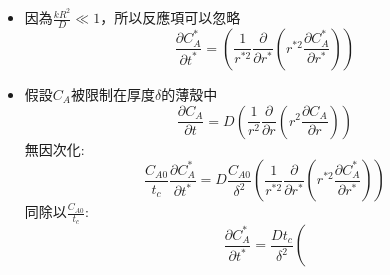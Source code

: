 \documentclass[../main.tex]{subfiles}
\begin{document}
\begin{itemize}
\begin{enumerate}
\begin{itemize}
\begin{equation}
          \left(
            r^{\ast 2} \frac{\partial C_A^\ast}{\partial r^\ast}
          \right)
        \right) - k C_{A0} C_A^\ast
      \end{equation}
      同除以$\frac{C_{A0}}{t_c}$:
      \begin{equation}
        \frac{\partial C_A^\ast}{\partial t^\ast} = \frac{D t_c}{R_0^2} \left(
          \frac{1}{r^{\ast 2}}\frac{\partial}{\partial r^\ast} 
          \left(
            r^{\ast 2} \frac{\partial C_A^\ast}{\partial r^\ast}
          \right)
        \right) - k t_c C_A^\ast
      \end{equation}
      因為題目說$\frac{kR^2}{D} \ll 1$，\\
      故令$t_c = \frac{R_0^2}{D}$:
      \begin{equation}
        \frac{\partial C_A^\ast}{\partial t^\ast} = \left(
          \frac{1}{r^{\ast 2}}\frac{\partial}{\partial r^\ast} 
          \left(
            r^{\ast 2} \frac{\partial C_A^\ast}{\partial r^\ast}
          \right)
        \right) - \frac{k R_0^2}{D} C_A^\ast
      \end{equation}
      \item 因為$\frac{kR^2}{D} \ll 1$，所以反應項可以忽略
      \begin{equation}
        \frac{\partial C_A^\ast}{\partial t^\ast} = \left(
          \frac{1}{r^{\ast 2}}\frac{\partial}{\partial r^\ast} 
          \left(
            r^{\ast 2} \frac{\partial C_A^\ast}{\partial r^\ast}
          \right)
        \right)
      \end{equation}
      \item 假設$C_A$被限制在厚度$\delta$的薄殼中
      \begin{equation}
        \frac{\partial C_A}{\partial t} = D \left(
          \frac{1}{r^2}\frac{\partial}{\partial r} 
          \left(
            r^2 \frac{\partial C_A}{\partial r}
          \right)
        \right)
      \end{equation}
      無因次化:
      \begin{equation}
        \frac{C_{A0}}{t_c} \frac{\partial C_A^\ast}{\partial t^\ast} = D \frac{C_{A0}}{\delta^2} \left(
          \frac{1}{r^{\ast 2}}\frac{\partial}{\partial r^\ast} 
          \left(
            r^{\ast 2} \frac{\partial C_A^\ast}{\partial r^\ast}
          \right)
        \right)
      \end{equation}
      同除以$\frac{C_{A0}}{t_c}$:
      \begin{equation}
        \frac{\partial C_A^\ast}{\partial t^\ast} = \frac{D t_c}{\delta^2} \left(

\end{equation}
\end{itemize}
\end{enumerate}
\end{itemize}
\end{document}
